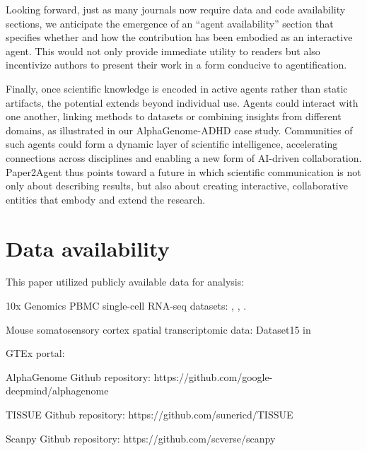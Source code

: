 \documentclass[11pt]{article}
\begin{document}
Looking forward, just as many journals now require data and code availability sections, we anticipate the emergence of an “agent availability” section that specifies whether and how the contribution has been embodied as an interactive agent. This would not only provide immediate utility to readers but also incentivize authors to present their work in a form conducive to agentification.

Finally, once scientific knowledge is encoded in active agents rather than static artifacts, the potential extends beyond individual use. Agents could interact with one another, linking methods to datasets or combining insights from different domains, as illustrated in our AlphaGenome-ADHD case study. %
Communities of such agents could form a dynamic layer of scientific intelligence, accelerating connections across disciplines and enabling a new form of AI-driven collaboration. Paper2Agent thus points toward a future in which scientific communication is not only about describing results, but also about creating interactive, collaborative entities that embody and extend the research.

\section*{Data availability}
This paper utilized publicly available data for analysis:
\begin{description}{
\normalsize
\item 10x Genomics PBMC single-cell RNA-seq datasets:
, 
, 
.

\item{Mouse somatosensory cortex spatial transcriptomic data:} Dataset15 in 

 \item{GTEx portal:} 

 \item{AlphaGenome Github repository: https://github.com/google-deepmind/alphagenome}
 \item{TISSUE Github repository: https://github.com/sunericd/TISSUE}

 \item{Scanpy Github repository: https://github.com/scverse/scanpy}
}
\end{description}
\end{document}
